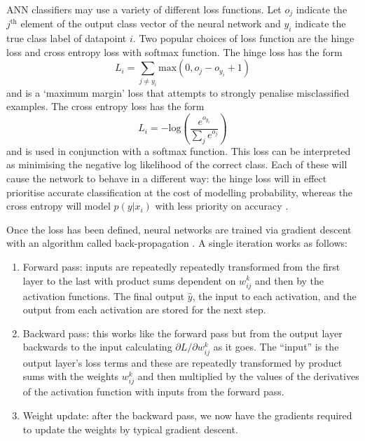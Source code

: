 ANN classifiers may use a variety of different loss functions. 
Let $o_{j}$ indicate the $j^{\mathrm{th}}$ element of the output class vector of the neural network and $y_{i}$ indicate the true class label of datapoint $i$. 
Two popular choices of loss function \cite{CS231n} are the hinge loss and cross entropy loss with softmax function.
The hinge loss has the form
\begin{equation}
    L_{i} = \sum_{j\neq{}y_{i}}\mathrm{max}(0,o_{j}-o_{y_{i}} + 1)
\end{equation}
and is a `maximum margin' loss that attempts to strongly penalise misclassified examples. 
The cross entropy loss has the form
\begin{equation}
    L_{i} = -\mathrm{log}\left(
        \frac{e^{o_{y_{i}}}}
        {\sum_{j}e^{o_{j}}}\right)
\end{equation}
and is used in conjunction with a softmax function. This loss can be interpreted as minimising the negative log likelihood of the correct class.
Each of these will cause the network to behave in a different way: the hinge loss will in effect prioritise accurate classification at the cost of modelling probability, whereas the cross entropy will model $p(y|x_{i})$ with less priority on accuracy \cite{CS231n}.

Once the loss has been defined, neural networks are trained via gradient descent with an algorithm called back-propagation \cite{Backprop}. A single iteration works as follows:
\begin{enumerate}[noitemsep]
    \item Forward pass: inputs are repeatedly repeatedly transformed from the first layer to the last with product sums dependent on $w_{ij}^{k}$ and then by the activation functions. The final output $\hat{y}$, the input to each activation, and the output from each activation are stored for the next step. 
    \item Backward pass: this works like the forward pass but from the output layer backwards to the input calculating $\partial{L}/\partial{w_{ij}^{k}}$ as it goes. The ``input'' is the output layer's loss terms and these are repeatedly transformed by product sums with the weights $w_{ij}^{k}$ and then multiplied by the values of the derivatives of the activation function with inputs from the forward pass.  
    \item Weight update: after the backward pass, we now have the gradients required to update the weights by typical gradient descent.
\end{enumerate}


